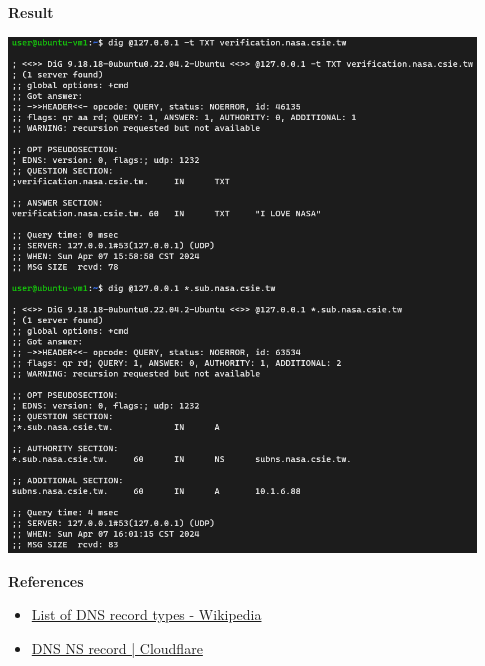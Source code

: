 \documentclass[12pt, a4paper]{article}
\begin{document}
\begin{enumerate}
    \pagebreak
    \textbf{Result}

    \includegraphics[width=0.93\textwidth]{4-3_dig.png}

    \textbf{References}
    \begin{itemize}
      \item \href{https://en.wikipedia.org/wiki/List_of_DNS_record_types}{List of DNS record types - Wikipedia}
      \item \href{https://www.cloudflare.com/learning/dns/dns-records/dns-ns-record/}{DNS NS record | Cloudflare}
    \end{itemize}
  \end{enumerate}
\end{document}
